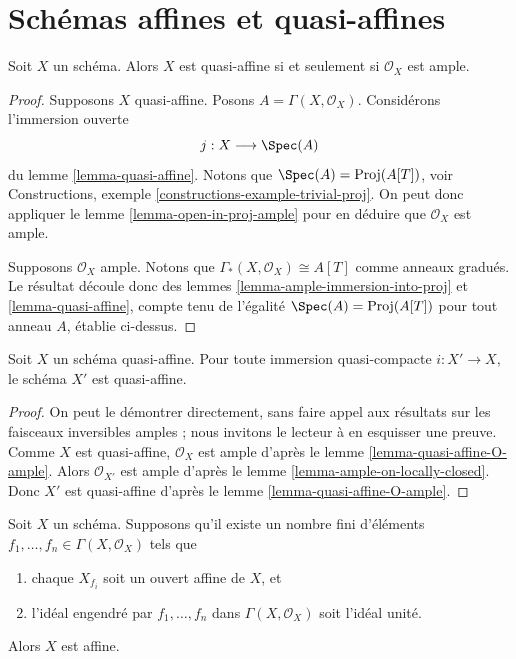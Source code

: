 \section{Schémas affines et quasi-affines}
\label{section-affine-quasi-affine}

\begin{lemma}
\label{lemma-quasi-affine-O-ample}
Soit $X$ un schéma.
Alors $X$ est quasi-affine si et seulement si $\mathcal{O}_X$ est ample.
\end{lemma}

\begin{proof}
Supposons $X$ quasi-affine. Posons $A = \Gamma(X, \mathcal{O}_X)$.
Considérons l'immersion ouverte
$$
j : X \longrightarrow \Spec(A)
$$
du lemme \ref{lemma-quasi-affine}. Notons que
$\Spec(A) = \text{Proj}(A[T])$,
voir Constructions, exemple \ref{constructions-example-trivial-proj}.
On peut donc appliquer le lemme \ref{lemma-open-in-proj-ample}
pour en déduire que $\mathcal{O}_X$ est ample.

\medskip\noindent
Supposons $\mathcal{O}_X$ ample.
Notons que $\Gamma_*(X, \mathcal{O}_X) \cong A[T]$
comme anneaux gradués. Le résultat découle donc des lemmes
\ref{lemma-ample-immersion-into-proj} et \ref{lemma-quasi-affine},
compte tenu de l'égalité
$\Spec(A) = \text{Proj}(A[T])$ pour tout anneau $A$,
établie ci-dessus.
\end{proof}

\begin{lemma}
\label{lemma-quasi-affine-locally-closed}
Soit $X$ un schéma quasi-affine. Pour toute immersion quasi-compacte
$i : X' \to X$, le schéma $X'$ est quasi-affine.
\end{lemma}

\begin{proof}
On peut le démontrer directement, sans faire appel aux résultats sur les
faisceaux inversibles amples ; nous invitons le lecteur à en esquisser une preuve.
Comme $X$ est quasi-affine, $\mathcal{O}_X$ est ample d'après
le lemme \ref{lemma-quasi-affine-O-ample}.
Alors $\mathcal{O}_{X'}$ est ample d'après
le lemme \ref{lemma-ample-on-locally-closed}. Donc $X'$ est quasi-affine d'après
le lemme \ref{lemma-quasi-affine-O-ample}.
\end{proof}

\begin{lemma}
\label{lemma-characterize-affine}
Soit $X$ un schéma. Supposons qu'il existe un nombre fini d'éléments
$f_1, \ldots, f_n \in \Gamma(X, \mathcal{O}_X)$ tels que
\begin{enumerate}
\item chaque $X_{f_i}$ soit un ouvert affine de $X$, et
\item l'idéal engendré par $f_1, \ldots, f_n$ dans
$\Gamma(X, \mathcal{O}_X)$ soit l'idéal unité.
\end{enumerate}
Alors $X$ est affine.
\end{lemma}


